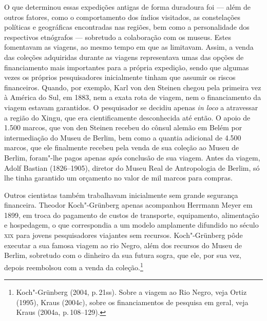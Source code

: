 O que determinou essas expedições antigas de forma duradoura foi --- além
de outros fatores, como o comportamento dos índios visitados, as
constelações políticas e geográficas encontradas nas regiões, bem como
a personalidade dos respectivos etnógrafos --- sobretudo a colaboração
com os museus. Estes fomentavam as viagens, ao mesmo tempo em que as
limitavam. Assim, a venda das coleções adquiridas durante as viagens
representava umas das opções de financiamento mais importantes para a
própria expedição, sendo que algumas vezes os próprios pesquisadores
inicialmente tinham que assumir os riscos financeiros. Quando, por
exemplo, Karl von den Steinen chegou pela primeira vez à América do Sul,
em 1883, nem a exata rota de viagem, nem o financiamento da viagem
estavam garantidos. O pesquisador se decidiu apenas \textit{in loco} a
atravessar a região do Xingu, que era cientificamente desconhecida até
então. O apoio de 1.500 marcos, que von den Steinen recebeu do cônsul
alemão em Belém por intermediação do Museu de Berlim, bem como a quantia
adicional de 4.500 marcos, que ele finalmente recebeu pela venda de sua
coleção ao Museu de Berlim, foram"-lhe pagos apenas \textit{após}
conclusão de sua viagem. Antes da viagem, Adolf Bastian (1826--1905),
diretor do Museu Real de Antropologia de Berlim, só lhe tinha garantido
um orçamento no valor de mil marcos para compras.

Outros cientistas também trabalhavam inicialmente sem grande segurança
financeira. Theodor Koch"-Grünberg apenas acompanhou Herrmann Meyer em
1899, em troca do pagamento de custos de transporte, equipamento,
alimentação e hospedagem, o que correspondia a um modelo amplamente
difundido no século \textsc{xix} para jovens pesquisadores viajantes sem
recursos. Koch"-Grünberg pôde executar a sua famosa viagem ao rio Negro,
além dos recursos do Museu de Berlim, sobretudo com o dinheiro da sua
futura sogra, que ele, por sua vez, depois reembolsou com a venda da
coleção.\footnote{Koch"-Grünberg (2004, p.\,21ss). Sobre a viagem ao Rio
  Negro, veja Ortiz (1995), Kraus (2004c), sobre os financiamentos de
  pesquisa em geral, veja Kraus (2004a, p.\,108--129).}

